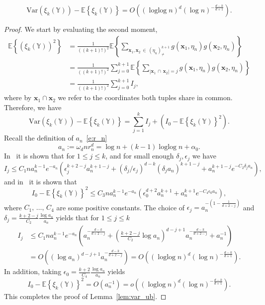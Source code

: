 \documentclass[AHL,Unicode,longabstracts]{cedram}
\DeclareMathOperator{\logg}{\log\log}
\newcommand{\bx}{\mathbf{x}}
\newcommand*\Y{\mathbb{Y}}
\newcommand{\E}{\mathbb{E}}
\newcommand{\mean}[1] {\E\left\{{#1}\right\}}
\newcommand{\var}[1]{\mathrm{Var}\param{{#1}}}
\newcommand{\param}[1]{\left(#1\right)}
\newcommand{\abs}[1] {\left| {#1}\right|}
\newcommand{\eps}{\epsilon}
\begin{document}
\begin{lemm}\label{lem:var_ub}
\[
\var{\xi_k(\Y)} - \mean{\xi_k(\Y)} = O\param{(\logg n)^d(\log n)^{-\frac{d-k}{d+1}}}.
\]
\end{lemm}

\begin{proof}
We start by evaluating the second moment,
\begin{align*}
\mean{\left(\xi_k(\Y)\right)^2} &= \frac{1}{((k+1)!)^2} \mean{\sum_{\bx_1,\bx_2\,\in\,(\eta_n)^{k+1}_{\ne}} g\left(\bx_1,\eta_n\right) g\left(\bx_2,\eta_n\right)} \\
&= \frac{1}{((k+1)!)^2} \sum_{j=0}^{k+1} \mean{\sum_{\abs{\bx_1\,\cap\,\bx_2} =j} g\left(\bx_1,\eta_n\right) g\left(\bx_2,\eta_n\right)}\\
&= \frac{1}{((k+1)!)^2} \sum_{j=0}^{k+1}I_j,
\end{align*}
where by $\bx_1\cap\bx_2$ we refer to the coordinates both tuples share in common. Therefore, we have
\[
\var{\xi_k(\Y)} - \mean{\xi_k(\Y)} = \sum_{j=1}^kI_j + \left(I_0-\mean{\xi_k(\Y)}^2\right).
\]
Recall the definition of $a_n$~\eqref{e:r_n}
\[
a_n := \omega_d nr_n^d = \log n + (k-1)\logg n + \alpha_0.
\]
In~\cite[Equation~(8.15)]{Bobrowski2019} it is shown that for $1\le j \le k$, and for small enough $\delta_j,\eps_j$ we have
\[
I_j \le C_1 n a_n^{k-1}e^{-a_n}\param{\eps_j^{k+2-j}a_n^{k+1-j} +\left(\delta_j/\eps_j\right)^{d-k}\left(\delta_j a_n\right)^{k+1-j} + a_n^{k+1-j}e^{-C_2\delta_j a_n}},
\]
and in~\cite[Equation~(8.17)]{Bobrowski2019} it is shown that
\[
I_0-\mean{\xi_k(\Y)}^2 \le C_3 n a_n^{k-1}e^{-a_n}\param{\eps_0^{d+2}a_n^{k+1}+a_n^{k+1}e^{-C_4\eps_0 a_n}},
\]
where $C_1,\,\ldots,\,C_4$ are some positive constants. The choice of $\eps_j = a_n^{-(1-\frac{1}{d+2-j})}$ and $\delta_j = \frac{k+2-j}{C_2} \frac{\log a_n}{a_n}$ yields that for $1 \leq j \leq k$
\begin{align*}
I_j & \leq C_1 n a_n^{k-1}e^{-a_n} \param{a_n^{-\frac{d-k}{d+2-j}} +\param{\frac{k+2-j}{C_2}\log a_n}^{d-j+1}a_n^{-\frac{d-k}{d+2-j}} + a_n^{-1} } \\
& = O\param{\left(\log a_n\right)^{d-j+1}a_n^{-\frac{d-k}{d+2-j}}} = O\param{(\logg n)^{d}(\log n)^{-\frac{d-k}{d+1}}}.
\end{align*}
In addition, taking $\eps_0 = \frac{k+2}{C_4}\frac{\log a_n}{a_n}$ yields
\[
I_0-\mean{\xi_k(\Y)}^2 = O\param{a_n^{-1}} = o\param{(\logg n)^d (\log n)^{-\frac{d-k}{d+1}}}.
\]
This completes the proof of Lemma~\ref{lem:var_ub}.
\end{proof}

\vspace{25pt}


\end{document}
